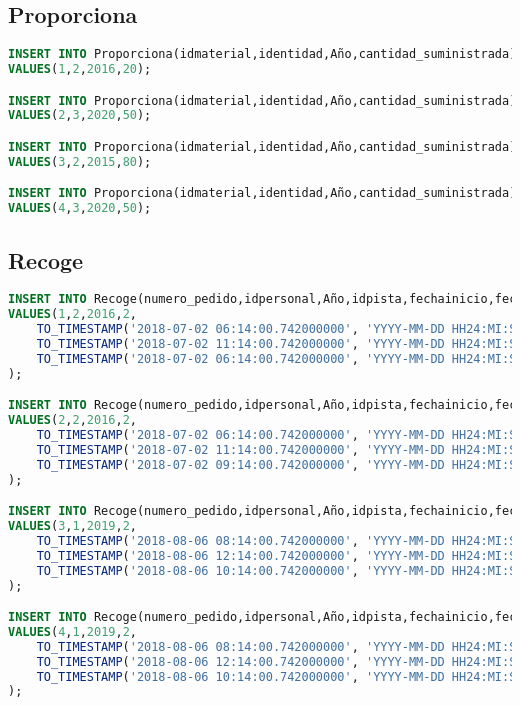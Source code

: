 \subsection{Proporciona}
\begin{lstlisting}[language=sql]
INSERT INTO Proporciona(idmaterial,identidad,Año,cantidad_suministrada)
VALUES(1,2,2016,20);

INSERT INTO Proporciona(idmaterial,identidad,Año,cantidad_suministrada)
VALUES(2,3,2020,50);

INSERT INTO Proporciona(idmaterial,identidad,Año,cantidad_suministrada)
VALUES(3,2,2015,80);

INSERT INTO Proporciona(idmaterial,identidad,Año,cantidad_suministrada)
VALUES(4,3,2020,50);
\end{lstlisting}

\pagebreak

\subsection{Recoge}
\begin{lstlisting}[language=sql]
INSERT INTO Recoge(numero_pedido,idpersonal,Año,idpista,fechainicio,fechafin,fecha)
VALUES(1,2,2016,2,
	TO_TIMESTAMP('2018-07-02 06:14:00.742000000', 'YYYY-MM-DD HH24:MI:SS.FF'),
	TO_TIMESTAMP('2018-07-02 11:14:00.742000000', 'YYYY-MM-DD HH24:MI:SS.FF'),
	TO_TIMESTAMP('2018-07-02 06:14:00.742000000', 'YYYY-MM-DD HH24:MI:SS.FF')
);

INSERT INTO Recoge(numero_pedido,idpersonal,Año,idpista,fechainicio,fechafin,fecha)
VALUES(2,2,2016,2,
	TO_TIMESTAMP('2018-07-02 06:14:00.742000000', 'YYYY-MM-DD HH24:MI:SS.FF'),
	TO_TIMESTAMP('2018-07-02 11:14:00.742000000', 'YYYY-MM-DD HH24:MI:SS.FF'),
	TO_TIMESTAMP('2018-07-02 09:14:00.742000000', 'YYYY-MM-DD HH24:MI:SS.FF')
);

INSERT INTO Recoge(numero_pedido,idpersonal,Año,idpista,fechainicio,fechafin,fecha)
VALUES(3,1,2019,2,
	TO_TIMESTAMP('2018-08-06 08:14:00.742000000', 'YYYY-MM-DD HH24:MI:SS.FF'),
	TO_TIMESTAMP('2018-08-06 12:14:00.742000000', 'YYYY-MM-DD HH24:MI:SS.FF'),
	TO_TIMESTAMP('2018-08-06 10:14:00.742000000', 'YYYY-MM-DD HH24:MI:SS.FF')
);

INSERT INTO Recoge(numero_pedido,idpersonal,Año,idpista,fechainicio,fechafin,fecha)
VALUES(4,1,2019,2,
	TO_TIMESTAMP('2018-08-06 08:14:00.742000000', 'YYYY-MM-DD HH24:MI:SS.FF'),
	TO_TIMESTAMP('2018-08-06 12:14:00.742000000', 'YYYY-MM-DD HH24:MI:SS.FF'),
	TO_TIMESTAMP('2018-08-06 10:14:00.742000000', 'YYYY-MM-DD HH24:MI:SS.FF')
);
\end{lstlisting}

